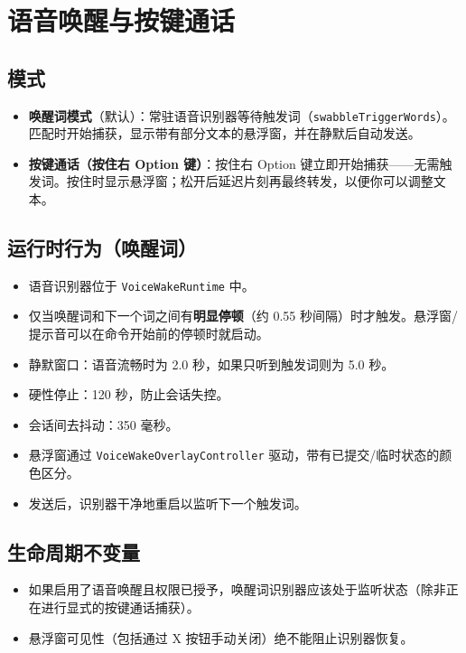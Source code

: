 \clearpage

\section{语音唤醒与按键通话}


\subsection{模式}


\begin{itemize}
  \item \textbf{唤醒词模式}（默认）：常驻语音识别器等待触发词（\texttt{swabbleTriggerWords}）。匹配时开始捕获，显示带有部分文本的悬浮窗，并在静默后自动发送。
  \item \textbf{按键通话（按住右 Option 键）}：按住右 Option 键立即开始捕获——无需触发词。按住时显示悬浮窗；松开后延迟片刻再最终转发，以便你可以调整文本。
\end{itemize}


\subsection{运行时行为（唤醒词）}


\begin{itemize}
  \item 语音识别器位于 \texttt{VoiceWakeRuntime} 中。
  \item 仅当唤醒词和下一个词之间有\textbf{明显停顿}（约 0.55 秒间隔）时才触发。悬浮窗/提示音可以在命令开始前的停顿时就启动。
  \item 静默窗口：语音流畅时为 2.0 秒，如果只听到触发词则为 5.0 秒。
  \item 硬性停止：120 秒，防止会话失控。
  \item 会话间去抖动：350 毫秒。
  \item 悬浮窗通过 \texttt{VoiceWakeOverlayController} 驱动，带有已提交/临时状态的颜色区分。
  \item 发送后，识别器干净地重启以监听下一个触发词。
\end{itemize}


\subsection{生命周期不变量}


\begin{itemize}
  \item 如果启用了语音唤醒且权限已授予，唤醒词识别器应该处于监听状态（除非正在进行显式的按键通话捕获）。
  \item 悬浮窗可见性（包括通过 X 按钮手动关闭）绝不能阻止识别器恢复。
\end{itemize}


